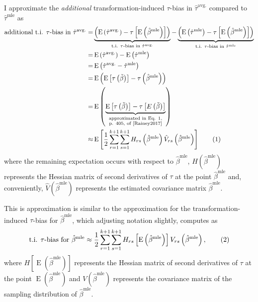 \documentclass[10pt]{article}
\newcommand\numberthis{\addtocounter{equation}{1}\tag{\theequation}}
\DeclareMathOperator*{\E}{\text{E}}
\begin{document}
I approximate the \textit{additional} transformation-induced $\tau$-bias in $\hat{\tau}^\text{avg.}$ compared to $\hat{\tau}^\text{mle}$ as
\begin{align*}
\text{additional t.i. $\tau$-bias in } \hat{\tau}^\text{avg.} =& \underbrace{\left( \E \left( \hat{\tau}^\text{avg.}\right) - \tau \left[\E \left( \hat{\beta}^\text{mle} \right) \right] \right) }_{\text{t.i. } \tau\text{-bias in }\hat{\tau}^{\text{avg.}}} - \underbrace{ \left( \E \left( \hat{\tau}^\text{mle}\right) -  \tau \left[\E \left( \hat{\beta}^\text{mle} \right) \right] \right)}_{\text{t.i. } \tau\text{-bias in }\hat{\tau}^{\text{mle}}}\\
=& \E \left( \hat{\tau}^\text{avg.}\right) - \E \left( \hat{\tau}^\text{mle}\right)\\
=& \E \left( \hat{\tau}^\text{avg.} - \hat{\tau}^\text{mle} \right)\\
=& \E \left(     \E \left[ \tau\left( \tilde{\beta} \right) \right]      -      \tau \left( \hat{\beta}^\text{mle} \right)     \right)\\
=& \E \left(     \underbrace{\E \left[ \tau\left( \tilde{\beta} \right) \right]      -      \tau \left[ E\left(  \tilde{\beta} \right)\right]}_{\substack{\text{approximated in Eq. 1,} \\ \text{p. 405, of \cite{Rainey2017}}}}   \right)\\
\approx & \E \left[ \dfrac{1}{2} \displaystyle \sum_{r = 1}^{k+1} \sum_{s = 1}^{k+1} H_{rs}\left( \hat{\beta}^\text{mle} \right) \hat{V}_{rs} \left( \hat{\beta}^{\text{mle}} \right) \right] \numberthis \label{eqn:avg-approx}
\end{align*}
where the remaining expectation occurs with respect to $\hat{\beta}^\text{mle}$, $H\left( \hat{\beta}^\text{mle} \right)$ represents the Hessian matrix of second derivatives of $\tau$ at the point $\hat{\beta}^\text{mle}$ and, conveniently, $\hat{V} \left( \hat{\beta}^{\text{mle}} \right)$ represents the estimated covariance matrix $\hat{\beta}^\text{mle}$.  

This is approximation is similar to the approximation for the transformation-induced $\tau$-bias for $\hat{\beta}^\text{mle}$, which adjusting notation slightly, \citet[p. 405, Eq. 1]{Rainey2017} computes as 
\begin{align*}
\text{t.i. } \tau \text{-bias for } \hat{\beta}^\text{mle} \approx \dfrac{1}{2} \displaystyle \sum_{r = 1}^{k+1} \sum_{s = 1}^{k+1} H_{rs}\left[ \E \left( \hat{\beta}^\text{mle} \right) \right] V_{rs} \left( \hat{\beta}^{\text{mle}} \right), \numberthis \label{eqn:mle-approx}
\end{align*} 
where $H\left[ \E \left( \hat{\beta}^\text{mle} \right) \right]$ represents the Hessian matrix of second derivatives of $\tau$ at the point $\E \left( \hat{\beta}^\text{mle} \right)$ and $V \left( \hat{\beta}^{\text{mle}} \right)$ represents the covariance matrix of the sampling distribution of $\hat{\beta}^\text{mle}$.
\end{document}
